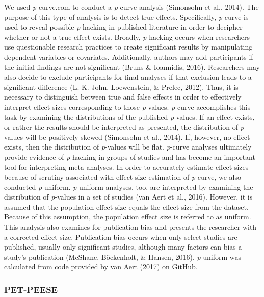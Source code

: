 \documentclass[english,man]{apa6}
\newcounter{author}
\theoremstyle{definition}
\theoremstyle{definition}
\theoremstyle{definition}
\theoremstyle{remark}
\begin{document}
We used \emph{p}-curve.com to conduct a \emph{p}-curve analysis
(Simonsohn et al., 2014). The purpose of this type of analysis is to
detect true effects. Specifically, \emph{p}-curve is used to reveal
possible \emph{p}-hacking in published literature in order to decipher
whether or not a true effect exists. Broadly, \emph{p}-hacking occurs
when researchers use questionable research practices to create
significant results by manipulating dependent variables or covariates.
Additionally, authors may add participants if the initial findings are
not significant (Bruns \& Ioannidis, 2016). Researchers may also decide
to exclude participants for final analyses if that exclusion leads to a
significant difference (L. K. John, Loewenstein, \& Prelec, 2012). Thus,
it is necessary to distinguish between true and false effects in order
to effectively interpret effect sizes corresponding to those
\emph{p}-values. \emph{p}-curve accomplishes this task by examining the
distributions of the published \emph{p}-values. If an effect exists, or
rather the results should be interpreted as presented, the distribution
of \emph{p}-values will be positively skewed (Simonsohn et al., 2014).
If, however, no effect exists, then the distribution of \emph{p}-values
will be flat. \emph{p}-curve analyses ultimately provide evidence of
\emph{p}-hacking in groups of studies and has become an important tool
for interpreting meta-analyses. In order to accurately estimate effect
sizes because of scrutiny associated with effect size estimation of
\emph{p}-curve, we also conducted \emph{p}-uniform. \emph{p}-uniform
analyses, too, are interpreted by examining the distribution of
\emph{p}-values in a set of studies (van Aert et al., 2016). However, it
is assumed that the population effect size equals the effect size from
the dataset. Because of this assumption, the population effect size is
referred to as uniform. This analysis also examines for publication bias
and presents the researcher with a corrected effect size. Publication
bias occurs when only select studies are published, usually only
significant studies, although many factors can bias a study's
publication (McShane, Böckenholt, \& Hansen, 2016). \emph{p}-uniform was
calculated from code provided by van Aert (2017) on GitHub.

\subsubsection{PET-PEESE}\label{pet-peese}
\end{document}
